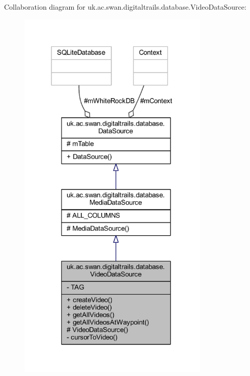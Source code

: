 Collaboration diagram for uk.\+ac.\+swan.\+digitaltrails.\+database.\+Video\+Data\+Source\+:
\nopagebreak
\begin{figure}[H]
\begin{center}
\leavevmode
\includegraphics[width=259pt]{classuk_1_1ac_1_1swan_1_1digitaltrails_1_1database_1_1_video_data_source__coll__graph}
\end{center}
\end{figure}
